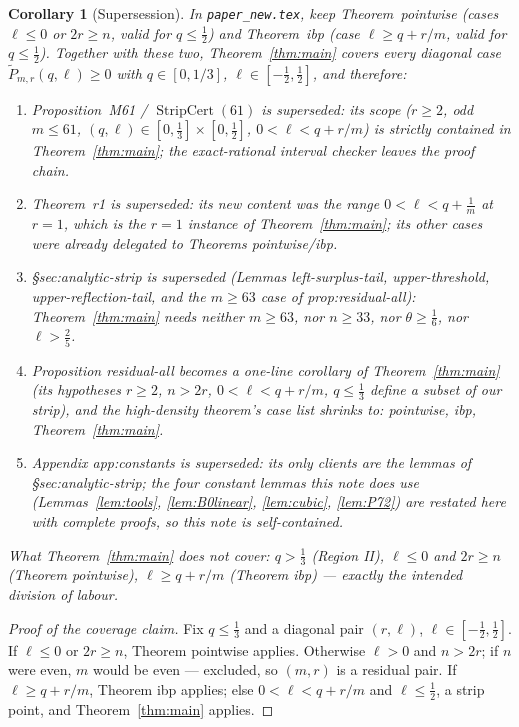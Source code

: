 \documentclass[11pt]{amsart}
\newtheorem{corollary}[theorem]{Corollary}
\theoremstyle{remark}
\newcommand{\wtP}{\widetilde P}
\begin{document}
\begin{corollary}[Supersession]\label{cor:supersede}
In \texttt{paper\_new.tex}, keep Theorem~\textup{pointwise} (cases $\ell\le0$ or $2r\ge n$, valid for $q\le\tfrac12$) and Theorem~\textup{ibp} (case $\ell\ge q+r/m$, valid for $q\le\tfrac12$).  Together with these two, Theorem~\ref{thm:main} covers every diagonal case $\wtP_{m,r}(q,\ell)\ge0$ with $q\in[0,1/3]$, $\ell\in[-\tfrac12,\tfrac12]$, and therefore:
\begin{enumerate}[label=\textup{(\alph*)}]
\item \emph{Proposition~M61 / $\operatorname{StripCert}(61)$ is superseded}: its scope ($r\ge2$, odd $m\le61$, $(q,\ell)\in[0,\tfrac13]\times[0,\tfrac12]$, $0<\ell<q+r/m$) is strictly contained in Theorem~\ref{thm:main}; the exact-rational interval checker leaves the proof chain.
\item \emph{Theorem~r1 is superseded}: its new content was the range $0<\ell<q+\tfrac1m$ at $r=1$, which is the $r=1$ instance of Theorem~\ref{thm:main}; its other cases were already delegated to Theorems pointwise/ibp.
\item \emph{\S sec:analytic-strip is superseded} (Lemmas left-surplus-tail, upper-threshold, upper-reflection-tail, and the $m\ge63$ case of prop:residual-all): Theorem~\ref{thm:main} needs neither $m\ge63$, nor $n\ge33$, nor $\theta\ge\tfrac16$, nor $\ell>\tfrac25$.
\item \emph{Proposition residual-all becomes a one-line corollary} of Theorem~\ref{thm:main} (its hypotheses $r\ge2$, $n>2r$, $0<\ell<q+r/m$, $q\le\tfrac13$ define a subset of our strip), and the high-density theorem's case list shrinks to: pointwise, ibp, Theorem~\ref{thm:main}.
\item \emph{Appendix app:constants is superseded}: its only clients are the lemmas of \S sec:analytic-strip; the four constant lemmas this note does use (Lemmas~\ref{lem:tools}, \ref{lem:B0linear}, \ref{lem:cubic}, \ref{lem:P72}) are restated here with complete proofs, so this note is self-contained.
\end{enumerate}
What Theorem~\ref{thm:main} does \emph{not} cover: $q>\tfrac13$ (Region II), $\ell\le0$ and $2r\ge n$ (Theorem pointwise), $\ell\ge q+r/m$ (Theorem ibp) --- exactly the intended division of labour.
\end{corollary}

\begin{proof}[Proof of the coverage claim]
Fix $q\le\tfrac13$ and a diagonal pair $(r,\ell)$, $\ell\in[-\tfrac12,\tfrac12]$.  If $\ell\le0$ or $2r\ge n$, Theorem pointwise applies.  Otherwise $\ell>0$ and $n>2r$; if $n$ were even, $m$ would be even --- excluded, so $(m,r)$ is a residual pair.  If $\ell\ge q+r/m$, Theorem ibp applies; else $0<\ell<q+r/m$ and $\ell\le\tfrac12$, a strip point, and Theorem~\ref{thm:main} applies.
\end{proof}
\end{document}
